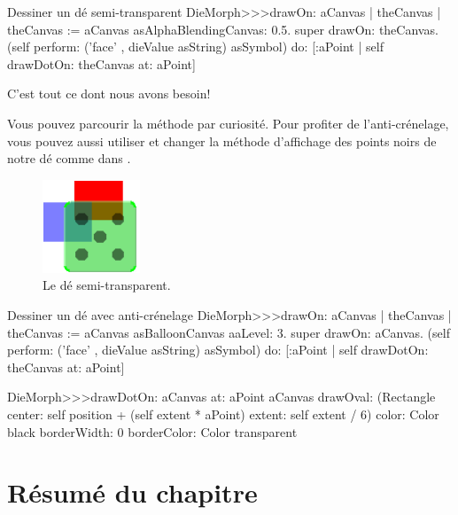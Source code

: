 \documentclass[a4paper,10pt,twoside]{book}
\begin{document}

\begin{method}{Dessiner un dé semi-transparent}
DieMorph>>>drawOn: aCanvas
	| theCanvas |
	theCanvas := aCanvas asAlphaBlendingCanvas: 0.5.
	super drawOn: theCanvas.
	(self perform: ('face' , dieValue asString) asSymbol)
		do: [:aPoint | self drawDotOn: theCanvas at: aPoint]
\end{method}
\noindent

C'est tout ce dont nous avons besoin! 

Vous pouvez parcourir la méthode
 par curiosité.
Pour profiter de l'anti-crénelage, vous pouvez aussi utiliser
 et changer la méthode d'affichage des points
noirs de notre dé comme dans .

\begin{figure}[ht]
	\centerline{\includegraphics[scale=0.7]{multiMorphs}}
	\caption{Le dé semi-transparent.\label{fig:multiMorphs}}
\end{figure}

\begin{methods}[aadie]{Dessiner un dé avec anti-crénelage}
DieMorph>>>drawOn: aCanvas
	| theCanvas |
	theCanvas := aCanvas asBalloonCanvas aaLevel: 3.
	super drawOn: aCanvas.
	(self perform: ('face' , dieValue asString) asSymbol)
		do: [:aPoint | self drawDotOn: theCanvas at: aPoint]

DieMorph>>>drawDotOn: aCanvas at: aPoint
	aCanvas
		drawOval: (Rectangle
			center: self position + (self extent * aPoint)
			extent: self extent / 6)
		color: Color black
		borderWidth: 0
		borderColor: Color transparent
\end{methods}

\section{Résumé du chapitre}
\end{document}
